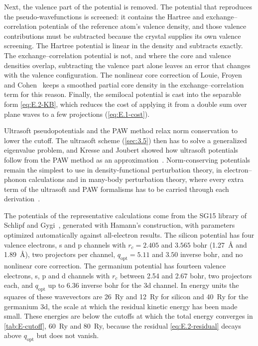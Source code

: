 Next, the valence part of the potential is removed. The potential that reproduces the pseudo-wavefunctions is screened: it contains the Hartree and exchange--correlation potentials of the reference atom's valence density, and those valence contributions must be subtracted because the crystal supplies its own valence screening. The Hartree potential is linear in the density and subtracts exactly. The exchange--correlation potential is not, and where the core and valence densities overlap, subtracting the valence part alone leaves an error that changes with the valence configuration. The nonlinear core correction of Louie, Froyen and Cohen~\cite{louie1982nonlinear} keeps a smoothed partial core density in the exchange--correlation term for this reason. Finally, the semilocal potential is cast into the separable form \cref{eq:E.2-KB}, which reduces the cost of applying it from a double sum over plane waves to a few projections (\cref{eq:E.1-cost}).

Ultrasoft pseudopotentials and the PAW method relax norm conservation to lower the cutoff. The ultrasoft scheme (\cref{sec:3.5}) then has to solve a generalized eigenvalue problem, and Kresse and Joubert showed how ultrasoft potentials follow from the PAW method as an approximation~\cite{kresse1999ultrasoft}. Norm-conserving potentials remain the simplest to use in density-functional perturbation theory, in electron--phonon calculations and in many-body perturbation theory, where every extra term of the ultrasoft and PAW formalisms has to be carried through each derivation~\cite{hamann2013optimized}.

The potentials of the representative calculations come from the SG15 library of Schlipf and Gygi~\cite{schlipf2015optimization}, generated with Hamann's construction, with parameters optimized automatically against all-electron results. The silicon potential has four valence electrons, s and p channels with $r_c = 2.405$ and $3.565$ bohr (\SI{1.27}{\angstrom} and \SI{1.89}{\angstrom}), two projectors per channel, $q_{\mathrm{opt}} = 5.11$ and $3.50$ inverse bohr, and no nonlinear core correction. The germanium potential has fourteen valence electrons, s, p and d channels with $r_c$ between 2.54 and 2.67 bohr, two projectors each, and $q_{\mathrm{opt}}$ up to 6.36 inverse bohr for the 3d channel. In energy units the squares of these wavevectors are \SI{26}{Ry} and \SI{12}{Ry} for silicon and \SI{40}{Ry} for the germanium 3d, the scale at which the residual kinetic energy has been made small. These energies are below the cutoffs at which the total energy converges in \cref{tab:E-cutoff}, \SI{60}{Ry} and \SI{80}{Ry}, because the residual \cref{eq:E.2-residual} decays above $q_{\mathrm{opt}}$ but does not vanish.

